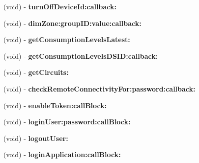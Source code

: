 \begin{DoxyCompactItemize}
\item 
\hypertarget{interface_m_d_d_s_s_manager_ac96629f2d573ee6acb469892c649533c}{(void) -\/ {\bfseries turn\-Off\-Device\-Id\-:callback\-:}}\label{interface_m_d_d_s_s_manager_ac96629f2d573ee6acb469892c649533c}

\item 
\hypertarget{interface_m_d_d_s_s_manager_ac0acf9ba53dd687b512b86b81d52085b}{(void) -\/ {\bfseries dim\-Zone\-:group\-I\-D\-:value\-:callback\-:}}\label{interface_m_d_d_s_s_manager_ac0acf9ba53dd687b512b86b81d52085b}

\item 
\hypertarget{interface_m_d_d_s_s_manager_a28b119a86c4ce5baaf5900800b404f74}{(void) -\/ {\bfseries get\-Consumption\-Levels\-Latest\-:}}\label{interface_m_d_d_s_s_manager_a28b119a86c4ce5baaf5900800b404f74}

\item 
\hypertarget{interface_m_d_d_s_s_manager_a84579d1873d6ca19a693c972296ebdcc}{(void) -\/ {\bfseries get\-Consumption\-Levels\-D\-S\-I\-D\-:callback\-:}}\label{interface_m_d_d_s_s_manager_a84579d1873d6ca19a693c972296ebdcc}

\item 
\hypertarget{interface_m_d_d_s_s_manager_ae616b77a6cd640f66217ea2aa70bc8a1}{(void) -\/ {\bfseries get\-Circuits\-:}}\label{interface_m_d_d_s_s_manager_ae616b77a6cd640f66217ea2aa70bc8a1}

\item 
\hypertarget{interface_m_d_d_s_s_manager_aecd0a69fb18177aaf5ee86352f281f26}{(void) -\/ {\bfseries check\-Remote\-Connectivity\-For\-:password\-:callback\-:}}\label{interface_m_d_d_s_s_manager_aecd0a69fb18177aaf5ee86352f281f26}

\item 
\hypertarget{interface_m_d_d_s_s_manager_af4e36efe26aba14e1f03f49eaa693b5e}{(void) -\/ {\bfseries enable\-Token\-:call\-Block\-:}}\label{interface_m_d_d_s_s_manager_af4e36efe26aba14e1f03f49eaa693b5e}

\item 
\hypertarget{interface_m_d_d_s_s_manager_a15356e1266e7a8745d56e68e2a10a70d}{(void) -\/ {\bfseries login\-User\-:password\-:call\-Block\-:}}\label{interface_m_d_d_s_s_manager_a15356e1266e7a8745d56e68e2a10a70d}

\item 
\hypertarget{interface_m_d_d_s_s_manager_a9143150016c264c7bd12a151f5eae90a}{(void) -\/ {\bfseries logout\-User\-:}}\label{interface_m_d_d_s_s_manager_a9143150016c264c7bd12a151f5eae90a}

\item 
\hypertarget{interface_m_d_d_s_s_manager_a82789c2ef49e5e6ebd4c43f9220afb3c}{(void) -\/ {\bfseries login\-Application\-:call\-Block\-:}}\label{interface_m_d_d_s_s_manager_a82789c2ef49e5e6ebd4c43f9220afb3c}

\end{DoxyCompactItemize}
